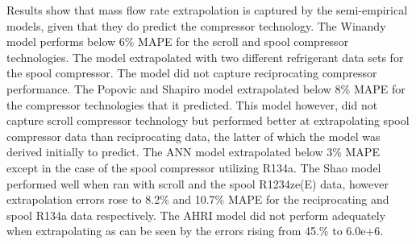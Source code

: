 \documentclass[preprint,11pt,authoryear]{elsarticle}
\begin{document}
\begin{table}[h]
\caption{Mass flow rate MAPE's under extrapolation scenarios.}
\label{Tab:data_info}
\begin{center}
\end{center}
\end{table}

Results show that mass flow rate extrapolation is captured by the semi-empirical models, given that they do predict the compressor technology. The Winandy model performs below 6\% MAPE for the scroll and spool compressor technologies. The model extrapolated with two different refrigerant data sets for the spool compressor. The model did not capture reciprocating compressor performance. The Popovic and Shapiro model extrapolated below 8\% MAPE for the compressor technologies that it predicted. This model however, did not capture scroll compressor technology but performed better at extrapolating spool compressor data than reciprocating data, the latter of which the model was derived initially to predict. The ANN model extrapolated below 3\% MAPE except in the case of the spool compressor utilizing R134a. The Shao model performed well when ran with scroll and the spool R1234ze(E) data, however extrapolation errors rose to 8.2\% and 10.7\% MAPE for the reciprocating and spool R134a data respectively. The AHRI model did not perform adequately when extrapolating as can be seen by the errors rising from 45.\% to 6.0e+6.

\end{document}
